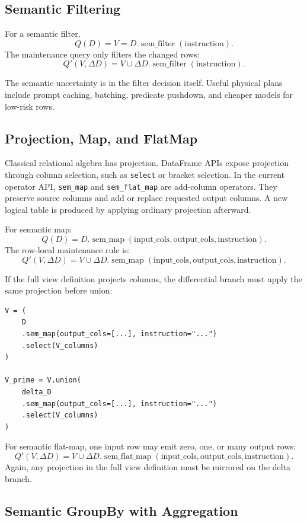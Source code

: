 \documentclass[11pt]{article}
\newcommand{\D}{D}
\newcommand{\V}{V}
\newcommand{\Q}{Q}
\newcommand{\DQ}{Q'}
\newcommand{\DeltaD}{\Delta D}
\newcommand{\SemMap}{\operatorname{sem\_map}}
\newcommand{\SemFlatMap}{\operatorname{sem\_flat\_map}}
\newcommand{\SemFilter}{\operatorname{sem\_filter}}
\begin{document}
\subsection{Semantic Filtering}

For a semantic filter,
\[
  \Q(\D) = \V = \D.\SemFilter(\mathrm{instruction}).
\]
The maintenance query only filters the changed rows:
\[
  \DQ(\V,\DeltaD)
  =
  \V \cup \DeltaD.\SemFilter(\mathrm{instruction}).
\]

The semantic uncertainty is in the filter decision itself. Useful physical
plans include prompt caching, batching, predicate pushdown, and cheaper models
for low-risk rows.

\subsection{Projection, Map, and FlatMap}

Classical relational algebra has projection. DataFrame APIs expose projection
through column selection, such as \texttt{select} or bracket selection. In the
current operator API, \texttt{sem\_map} and \texttt{sem\_flat\_map} are
add-column operators. They preserve source columns and add or replace requested
output columns. A new logical table is produced by applying ordinary
projection afterward.

For semantic map:
\[
  \Q(\D)
  =
  \D.\SemMap(\mathrm{input\_cols},\mathrm{output\_cols},
  \mathrm{instruction}).
\]
The row-local maintenance rule is:
\[
  \DQ(\V,\DeltaD)
  =
  \V \cup
  \DeltaD.\SemMap(\mathrm{input\_cols},\mathrm{output\_cols},
  \mathrm{instruction}).
\]

If the full view definition projects columns, the differential branch must
apply the same projection before union:

\begin{verbatim}
V = (
    D
    .sem_map(output_cols=[...], instruction="...")
    .select(V_columns)
)

V_prime = V.union(
    delta_D
    .sem_map(output_cols=[...], instruction="...")
    .select(V_columns)
)
\end{verbatim}

For semantic flat-map, one input row may emit zero, one, or many output rows:
\[
  \DQ(\V,\DeltaD)
  =
  \V \cup
  \DeltaD.\SemFlatMap(\mathrm{input\_cols},\mathrm{output\_cols},
  \mathrm{instruction}).
\]
Again, any projection in the full view definition must be mirrored on the delta
branch.

\subsection{Semantic GroupBy with Aggregation}
\end{document}
